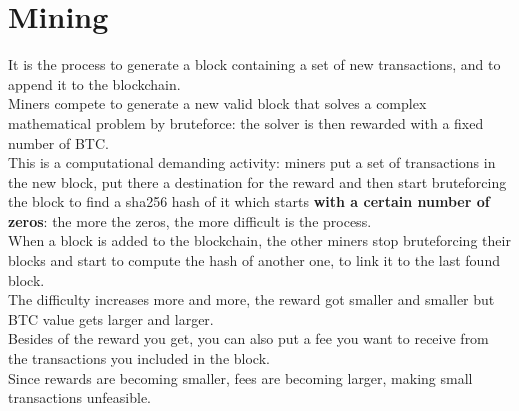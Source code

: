    \section{Mining}
        It is the process to generate a block containing a set of new transactions, and to append it to the blockchain.\\
        Miners compete to generate a new valid block that solves a complex mathematical problem by bruteforce: the solver is then rewarded with a fixed number of BTC.\\
        This is a computational demanding activity: miners put a set of transactions in the new block, put there a destination for the reward and then start bruteforcing the block to find a sha256 hash of it which starts \textbf{with a certain number of zeros}: the more the zeros, the more difficult is the process.\\
        When a block is added to the blockchain, the other miners stop bruteforcing their blocks and start to compute the hash of another one, to link it to the last found block.\\
        The difficulty increases more and more, the reward got smaller and smaller but BTC value gets larger and larger.\\
        Besides of the reward you get, you can also put a fee you want to receive from the transactions you included in the block.\\ 
        Since rewards are becoming smaller, fees are becoming larger, making small transactions unfeasible.
\newpage    
